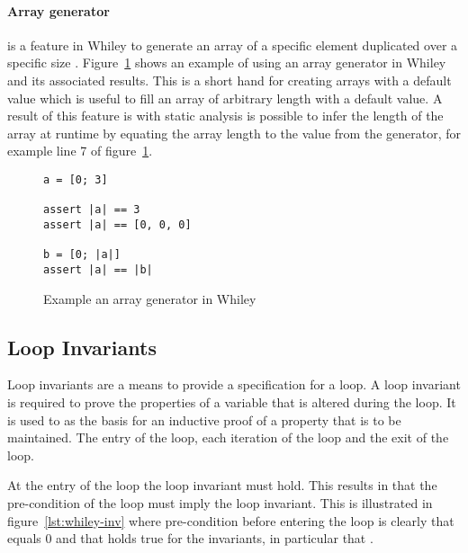 \paragraph{Array generator} is a feature in Whiley to generate an array
of a specific element duplicated over a specific size \cite{whiley-spec}
\cite{whiley-arrays}.
Figure~\ref{lst:whiley-array-gen} shows an example of using an array generator
in Whiley and its associated results.
This is a short hand for creating arrays with a default value which is useful
to fill an array of arbitrary length with a default value.
A result of this feature is with static analysis is possible to infer the 
length of the array at runtime by equating the array length to the value
from the generator, for example line 7 of figure~\ref{lst:whiley-array-gen}.

\begin{figure}[ht]
\begin{lstlisting}
a = [0; 3]

assert |a| == 3
assert |a| == [0, 0, 0]

b = [0; |a|]
assert |a| == |b|
\end{lstlisting}
    \label{lst:whiley-array-gen}
    \caption{Example an array generator in Whiley}
\end{figure}

\subsection{Loop Invariants}

Loop invariants are a means to provide a specification for a loop.
A loop invariant is required to prove the properties of a variable
that is altered during the loop.
It is used to as the basis for an inductive proof of a
property that is to be maintained.
The entry of the loop, each iteration of the loop and the exit of the
loop.

At the entry of the loop the loop invariant must hold.
This results in that the pre-condition of the loop must imply
the loop invariant.
This is illustrated in figure~\ref{lst:whiley-inv} where pre-condition
before entering the loop is clearly that  equals 0 and that holds
true for the invariants, in particular that .

